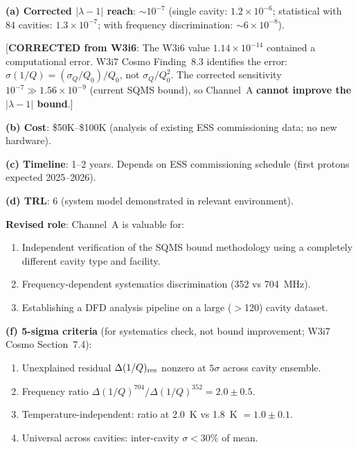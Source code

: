 \documentclass[11pt]{article}
\newcommand{\lam}{\lambda}
\newcommand{\ee}[1]{\times 10^{#1}}
\newcommand{\lbone}{|\lam - 1|}
\theoremstyle{definition}
\theoremstyle{remark}
\begin{document}
\begin{tcolorbox}[colback=red!5!white, colframe=red!60!black,
  title=\textbf{RANK \#5: ESS LUND CHANNEL~A --- CORRECTED, CANNOT
  IMPROVE BOUND}]

\textbf{(a) Corrected $\lbone$ reach}: $\sim 10^{-7}$ (single cavity:
$1.2\ee{-6}$; statistical with 84 cavities: $1.3\ee{-7}$; with
frequency discrimination: $\sim 6\ee{-8}$).

[\textbf{CORRECTED from W3i6}: The W3i6 value $1.14\ee{-14}$ contained
a computational error. W3i7 Cosmo Finding~8.3 identifies the error:
$\sigma(1/Q) = (\sigma_Q/Q_0)/Q_0$, not $\sigma_Q/Q_0^2$. The corrected
sensitivity $10^{-7} \gg 1.56\ee{-9}$ (current SQMS bound), so Channel~A
\textbf{cannot improve the $\lbone$ bound}.]

\textbf{(b) Cost}: \$50K--\$100K (analysis of existing ESS commissioning
data; no new hardware).

\textbf{(c) Timeline}: 1--2 years. Depends on ESS commissioning
schedule (first protons expected 2025--2026).

\textbf{(d) TRL}: 6 (system model demonstrated in relevant environment).

\textbf{Revised role}: Channel~A is valuable for:
\begin{enumerate}[nosep]
\item Independent verification of the SQMS bound methodology using a
  completely different cavity type and facility.
\item Frequency-dependent systematics discrimination (352 vs 704~MHz).
\item Establishing a DFD analysis pipeline on a large ($>$120) cavity
  dataset.
\end{enumerate}

\textbf{(f) 5-sigma criteria} (for systematics check, not bound
improvement; W3i7 Cosmo Section~7.4):
\begin{enumerate}[nosep]
\item Unexplained residual $\Delta(1/Q)_{\rm res}$ nonzero at $5\sigma$
  across cavity ensemble.
\item Frequency ratio $\Delta(1/Q)^{704}/\Delta(1/Q)^{352} = 2.0 \pm 0.5$.
\item Temperature-independent: ratio at 2.0~K vs 1.8~K $= 1.0 \pm 0.1$.
\item Universal across cavities: inter-cavity $\sigma < 30\%$ of mean.
\end{enumerate}

\end{tcolorbox}
\end{document}
